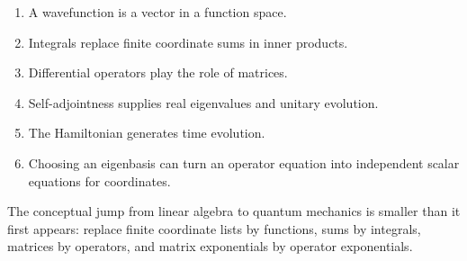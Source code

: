 \documentclass[11pt,a4paper]{article}
\begin{document}
\begin{enumerate}
\item A wavefunction is a vector in a function space.
\item Integrals replace finite coordinate sums in inner products.
\item Differential operators play the role of matrices.
\item Self-adjointness supplies real eigenvalues and unitary evolution.
\item The Hamiltonian generates time evolution.
\item Choosing an eigenbasis can turn an operator equation into independent scalar equations for coordinates.
\end{enumerate}

\begin{checkBox}
The conceptual jump from linear algebra to quantum mechanics is smaller than it first appears: replace finite coordinate lists by functions, sums by integrals, matrices by operators, and matrix exponentials by operator exponentials.
\end{checkBox}
\end{document}
